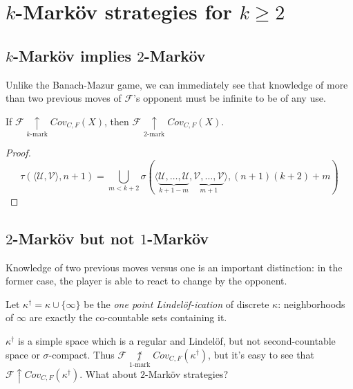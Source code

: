 \documentclass{beamer}
\theoremstyle{definition}
\newcommand{\win}{\uparrow}
\newcommand{\kmarkwin}[1]{\underset{#1\text{-mark}}{\uparrow}}
\newcommand{\notkmarkwin}[1]{\underset{#1\text{-mark}}{\not\uparrow}}
\newcommand{\oneptlind}[1]{#1^\dagger}
\newcommand{\mengame}[1]{Cov_{C,F}(#1)}
\newcommand{\<}{\langle}
\renewcommand{\>}{\rangle}
\newcommand{\mc}[1]{\mathcal{#1}}
\newcommand{\pl}[1]{\mathscr{#1}}
\newcommand{\term}{\textit}
\begin{document}
\section{$k$-Mark\"ov strategies for $k\geq 2$}

\subsection{$k$-Mark\"ov implies $2$-Mark\"ov}

\begin{frame}
  Unlike the Banach-Mazur game, we can immediately see that knowledge
  of more than two previous moves of $\pl F$'s opponent must be infinite
  to be of any use.

  \begin{theorem}
    If $\pl F \kmarkwin{k}\mengame X$, then $\pl F \kmarkwin2\mengame X$.
  \end{theorem}

  \begin{proof}
    \[
      \tau(\<\mc U,\mc V\>,n+1)
        =
      \bigcup_{m<k+2}
        \sigma(\<
          \underbrace{\mc U,\dots,\mc U}_{k+1-m},
          \underbrace{\mc V,\dots,\mc V}_{m+1}
        \>,(n+1)(k+2)+m)
    \]
  \end{proof}
\end{frame}

\subsection{$2$-Mark\"ov but not $1$-Mark\"ov}

\begin{frame}
  Knowledge of two previous moves versus one is an important distinction:
  in the former case, the player is able to react to change by the
  opponent.

  \pause

  \begin{definition}
    Let $\oneptlind\kappa = \kappa\cup\{\infty\}$ be the
    \term{one point Lindel\"of-ication} of discrete $\kappa$: neighborhoods
    of $\infty$ are exactly the co-countable sets containing it.
  \end{definition}

  \pause

  $\oneptlind\kappa$ is a simple space which is a regular and Lindel\"of, but
  not second-countable space or $\sigma$-compact. Thus
  $\pl F\notkmarkwin{1}\mengame{\oneptlind\kappa}$, but it's easy to see
  that $\pl F\win\mengame{\oneptlind\kappa}$. What about $2$-Mark\"ov
  strategies?
\end{frame}
\end{document}
